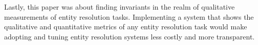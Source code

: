 \documentclass[lettersize,journal]{IEEEtran}
\begin{document}
    Lastly, this paper was about finding invariants in the realm of qualitative
    measurements of entity resolution tasks.
    Implementing a system that shows the qualitative and quantitative metrics
    of any entity resolution task would make adopting and tuning entity
    resolution systems less costly and more transparent.

    
\end{document}
